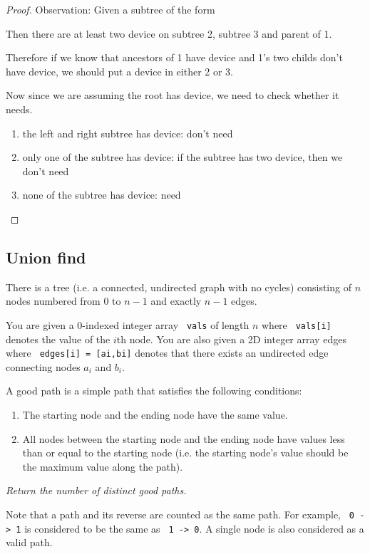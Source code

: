 \documentclass[11pt]{article}
\let\OldTexttt\texttt
\renewcommand{\texttt}[1]{\OldTexttt{\color{MidnightBlue} #1}}
\begin{document}
\begin{proof}
Observation: Given a subtree of the form
\begin{center}\end{center}
Then there are at least two device on subtree 2, subtree 3 and parent of 1.

Therefore if we know that ancestors of 1 have device and 1's two childs don't have device, we
should put a device in either 2 or 3.

Now since we are assuming the root has device, we need to check whether it needs.
\begin{enumerate}
\item the left and right subtree has device: don't need
\item only one of the subtree has device: if the subtree has two device, then we don't need
\item none of the subtree has device: need
\end{enumerate}
\end{proof}
\subsection{Union find}
\label{sec:org7499ab6}
\begin{problem}
There is a tree (i.e. a connected, undirected graph with no cycles) consisting of \(n\) nodes
numbered from 0 to \(n-1\) and exactly \(n - 1\) edges.

You are given a 0-indexed integer array \texttt{vals} of length \(n\) where \texttt{vals[i]} denotes the value of the
\(i\)th node. You are also given a 2D integer array edges where \texttt{edges[i] = [ai,bi]} denotes that
there exists an undirected edge connecting nodes \(a_i\) and \(b_i\).

A good path is a simple path that satisfies the following conditions:
\begin{enumerate}
\item The starting node and the ending node have the same value.
\item All nodes between the starting node and the ending node have values less than or equal to the
starting node (i.e. the starting node's value should be the maximum value along the path).
\end{enumerate}

\emph{Return the number of distinct good paths.}

Note that a path and its reverse are counted as the same path. For example, \texttt{0 -> 1} is considered
to be the same as \texttt{1 -> 0}. A single node is also considered as a valid path.
\end{problem}
\end{document}
